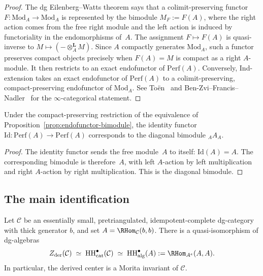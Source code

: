 \begin{proof}
The dg Eilenberg--Watts theorem says that a colimit-preserving
functor $F\colon \mathrm{Mod}_A\to\mathrm{Mod}_A$ is represented by
the bimodule $M_F:=F(A)$, where the right action comes from the free
right module and the left action is induced by functoriality in the
endomorphisms of~$A$.  The assignment $F\mapsto F(A)$ is quasi-inverse
to $M\mapsto(-\otimes_A^{\mathbf L}M)$.  Since $A$ compactly
generates $\mathrm{Mod}_A$, such a functor preserves compact objects
precisely when $F(A)=M$ is compact as a right $A$-module.  It then
restricts to an exact endofunctor of $\mathrm{Perf}(A)$.  Conversely,
Ind-extension takes an exact endofunctor of $\mathrm{Perf}(A)$ to a
colimit-preserving, compact-preserving endofunctor of
$\mathrm{Mod}_A$.  See
To\"en~\cite{Toen07} and Ben-Zvi--Francis--Nadler~\cite{BZFN10} for
the $\infty$-categorical statement.
\end{proof}

\begin{corollary}[Identity functor $=$ diagonal bimodule]
\label{cor:identity-diagonal}
\ClaimStatusProvedHere
Under the compact-preserving restriction of the equivalence of
Proposition~\textup{\ref{prop:endofunctor-bimodule}}, the identity
functor $\mathrm{Id}\colon \mathrm{Perf}(A) \to \mathrm{Perf}(A)$
corresponds to the diagonal bimodule ${}_A A_A$.
\end{corollary}

\begin{proof}
The identity functor sends the free module~$A$ to itself:
$\mathrm{Id}(A) = A$. The corresponding bimodule is therefore~$A$,
with left $A$-action by left multiplication and right $A$-action by
right multiplication. This is the diagonal bimodule.
\end{proof}

\subsection{The main identification}

\begin{theorem}[Derived center $=$ categorical Hochschild cohomology $=$ algebraic Hochschild cochains via a thick generator;
\ClaimStatusProvedHere]
\label{thm:derived-center-hochschild}
Let\/ $\mathcal{C}$ be an essentially small, pretriangulated,
idempotent-complete dg-category with thick generator $b$, and set
$A = \RHom_{\mathcal{C}}(b, b)$.  There is a quasi-isomorphism of
dg-algebras
\begin{equation}\label{eq:derived-center-HH}
Z_{\mathrm{der}}(\mathcal{C})
\;\simeq\;
\mathrm{HH}^\bullet_{\mathrm{cat}}(\mathcal{C})
\;\simeq\;
\mathrm{HH}^\bullet_{\mathrm{alg}}(A)
:= \RHom_{A^e}(A, A).
\end{equation}
In particular, the derived center is a Morita invariant of
$\mathcal C$.
\end{theorem}

